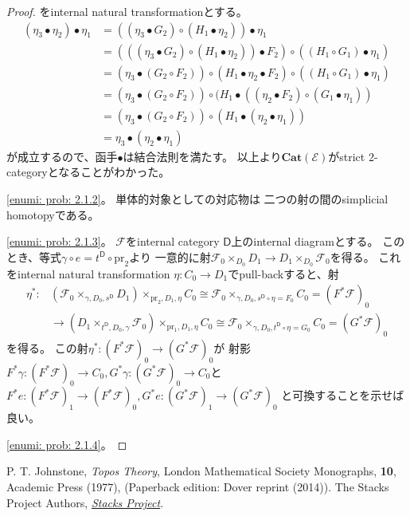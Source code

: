 \documentclass[uplatex]{jsarticle}
\theoremstyle{definition}
\def\mcE{\mathcal{E}}
\def\mcF{\mathcal{F}}
\def\msD{\mathsf{D}}
\begin{document}
\begin{proof}
  をinternal natural transformationとする。
  \begin{align*}
    (\eta_3\bullet\eta_2)\bullet\eta_1
    &= ((\eta_3\bullet G_2)\circ(H_1\bullet\eta_2)) \bullet \eta_1 \\
    &= (((\eta_3\bullet G_2)\circ(H_1\bullet\eta_2))\bullet F_2)
    \circ ((H_1\circ G_1)\bullet\eta_1) \\
    &= (\eta_3\bullet (G_2\circ F_2)) \circ (H_1\bullet\eta_2\bullet F_2)
    \circ ((H_1\circ G_1)\bullet\eta_1) \\
    &= (\eta_3\bullet (G_2\circ F_2)) \circ
    (H_1\bullet ((\eta_2\bullet F_2) \circ (G_1\bullet\eta_1)) \\
    &= (\eta_3\bullet (G_2\circ F_2)) \circ (H_1\bullet (\eta_2\bullet \eta_1)) \\
    &= \eta_3\bullet (\eta_2\bullet\eta_1)
  \end{align*}
  が成立するので、函手\(\bullet\)は結合法則を満たす。
  以上より\(\mathbf{Cat}(\mcE)\)がstrict 2-categoryとなることがわかった。

  \ref{enumi: prob: 2.1.2}。
  単体的対象としての対応物は
  二つの射の間のsimplicial homotopyである。

  \ref{enumi: prob: 2.1.3}。
  \(\mcF\)をinternal category \(\msD\)上のinternal diagramとする。
  このとき、等式\(\gamma\circ e = t^{\msD}\circ \mathrm{pr}_2\)より
  一意的に射\(\mcF_0\times_{D_0}D_1 \to D_1\times_{D_0}\mcF_0\)を得る。
  これをinternal natural transformation \(\eta:C_0\to D_1\)でpull-backすると、射
  \begin{align*}
    \eta^* : &(\mcF_0 \times_{\gamma,D_0,s^{\msD}} D_1) \times_{\mathrm{pr}_2,D_1,\eta} C_0
    \cong \mcF_0\times_{\gamma,D_0,s^{\msD}\circ \eta = F_0} C_0
    = (F^*\mcF)_0 \\
    &\to (D_1 \times_{t^{\msD},D_0,\gamma} \mcF_0) \times_{\mathrm{pr}_1,D_1,\eta} C_0
    \cong \mcF_0\times_{\gamma,D_0,t^{\msD}\circ \eta = G_0} C_0
    = (G^*\mcF)_0
  \end{align*}
  を得る。
  この射\(\eta^*:(F^*\mcF)_0 \to (G^*\mcF)_0\)が
  射影\(F^*\gamma: (F^*\mcF)_0\to C_0, G^*\gamma: (G^*\mcF)_0\to C_0\)と
  \(F^*e: (F^*\mcF)_1\to (F^*\mcF)_0, G^*e: (G^*\mcF)_1\to (G^*\mcF)_0\)
  と可換することを示せば良い。

  \ref{enumi: prob: 2.1.4}。
\end{proof}


\newpage
\begin{thebibliography}{9}
  P. T. Johnstone,
  \textit{Topos Theory},
  London Mathematical Society Monographs,
  \textbf{10}, Academic Press (1977),
  (Paperback edition: Dover reprint (2014)).
  The Stacks Project Authors,
  \href{https://stacks.math.columbia.edu/}{\textit{Stacks Project}}.
\end{thebibliography}
\end{document}
